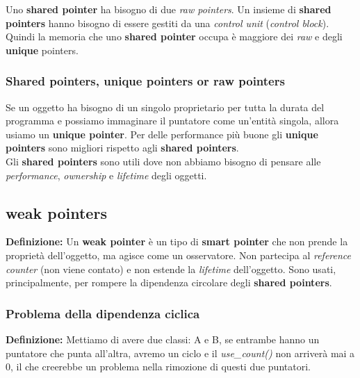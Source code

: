 \textsf{\small Uno \textbf{shared pointer} ha bisogno di due \emph{raw pointers}. Un insieme di \textbf{shared pointers} hanno bisogno di essere gestiti da una \emph{control unit} (\emph{control block}). Quindi la memoria che uno \textbf{shared pointer} occupa è maggiore dei \emph{raw} e degli \textbf{unique} pointers.} \\

\subsubsection{Shared pointers, unique pointers or raw pointers}

\textsf{\small Se un oggetto ha bisogno di un singolo proprietario per tutta la durata del programma e possiamo immaginare il puntatore come un'entità singola, allora usiamo un \textbf{unique pointer}. Per delle performance più buone gli \textbf{unique pointers} sono migliori rispetto agli \textbf{shared pointers}.} \\

\textsf{\small Gli \textbf{shared pointers} sono utili dove non abbiamo bisogno di pensare alle \emph{performance}, \emph{ownership} e \emph{lifetime} degli oggetti.}

\subsection{weak pointers}

\textsf{\small \textbf{Definizione: } Un \textbf{weak pointer} è un tipo di \textbf{smart pointer} che non prende la proprietà dell'oggetto, ma agisce come un osservatore. Non partecipa al \emph{reference counter} (non viene contato) e non estende la \emph{lifetime} dell'oggetto. } \break 
\textsf{\small Sono usati, principalmente, per rompere la dipendenza circolare degli \textbf{shared pointers}.} \\

\subsubsection{Problema della dipendenza ciclica}

\textsf{\small \textbf{Definizione: } Mettiamo di avere due classi: A e B, se entrambe hanno un puntatore che punta all'altra, avremo un ciclo e il \emph{use\_count()} non arriverà mai a 0, il che creerebbe un problema nella rimozione di questi due puntatori.} \\

